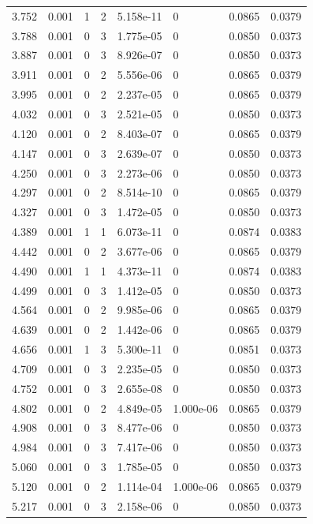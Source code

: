 \documentclass[preview]{standalone}
\begin{document}
{{{\begin{tabular}{L{1.2cm}C{1.2cm} C{0.3cm}C{0.5cm} C{1.4cm}C{1.4cm} C{1.4cm}C{1.4cm}}
  3.752  &  0.001  & 1     &  2 &  5.158e-11  & 0  & 0.0865 &  0.0379   \\ 
  3.788  &  0.001  & 0     &  3 &  1.775e-05  & 0  & 0.0850 &  0.0373   \\ 
  3.887  &  0.001  & 0     &  3 &  8.926e-07  & 0  & 0.0850 &  0.0373   \\ 
  3.911  &  0.001  & 0     &  2 &  5.556e-06  & 0  & 0.0865 &  0.0379   \\ 
  3.995  &  0.001  & 0     &  2 &  2.237e-05  & 0  & 0.0865 &  0.0379   \\ 
  4.032  &  0.001  & 0     &  3 &  2.521e-05  & 0  & 0.0850 &  0.0373   \\ 
  4.120  &  0.001  & 0     &  2 &  8.403e-07  & 0  & 0.0865 &  0.0379   \\ 
  4.147  &  0.001  & 0     &  3 &  2.639e-07  & 0  & 0.0850 &  0.0373   \\ 
  4.250  &  0.001  & 0     &  3 &  2.273e-06  & 0  & 0.0850 &  0.0373   \\ 
  4.297  &  0.001  & 0     &  2 &  8.514e-10  & 0  & 0.0865 &  0.0379   \\ 
  4.327  &  0.001  & 0     &  3 &  1.472e-05  & 0  & 0.0850 &  0.0373   \\ 
  4.389  &  0.001  & 1     &  1 &  6.073e-11  & 0  & 0.0874 &  0.0383   \\ 
  4.442  &  0.001  & 0     &  2 &  3.677e-06  & 0  & 0.0865 &  0.0379   \\ 
  4.490  &  0.001  & 1     &  1 &  4.373e-11  & 0  & 0.0874 &  0.0383   \\ 
  4.499  &  0.001  & 0     &  3 &  1.412e-05  & 0  & 0.0850 &  0.0373   \\ 
  4.564  &  0.001  & 0     &  2 &  9.985e-06  & 0  & 0.0865 &  0.0379   \\ 
  4.639  &  0.001  & 0     &  2 &  1.442e-06  & 0  & 0.0865 &  0.0379   \\ 
  4.656  &  0.001  & 1     &  3 &  5.300e-11  & 0  & 0.0851 &  0.0373   \\ 
  4.709  &  0.001  & 0     &  3 &  2.235e-05  & 0  & 0.0850 &  0.0373   \\ 
  4.752  &  0.001  & 0     &  3 &  2.655e-08  & 0  & 0.0850 &  0.0373   \\ 
  4.802  &  0.001  & 0     &  2 &  4.849e-05  & 1.000e-06  & 0.0865 &  0.0379   \\ 
  4.908  &  0.001  & 0     &  3 &  8.477e-06  & 0  & 0.0850 &  0.0373   \\ 
  4.984  &  0.001  & 0     &  3 &  7.417e-06  & 0  & 0.0850 &  0.0373   \\ 
  5.060  &  0.001  & 0     &  3 &  1.785e-05  & 0  & 0.0850 &  0.0373   \\ 
  5.120  &  0.001  & 0     &  2 &  1.114e-04  & 1.000e-06  & 0.0865 &  0.0379   \\ 
  5.217  &  0.001  & 0     &  3 &  2.158e-06  & 0  & 0.0850 &  0.0373   \\ 
\hline 
\end{tabular} 

}}}
\end{document}
